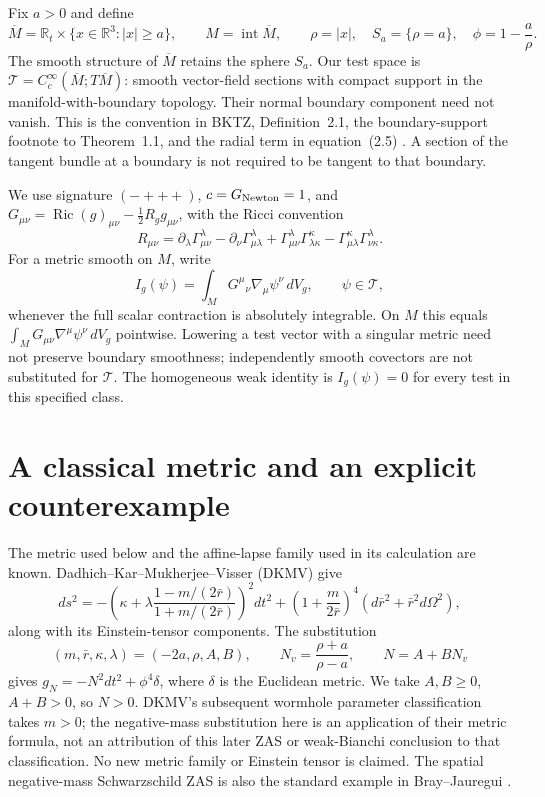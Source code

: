 \documentclass[11pt]{article}
\newcommand{\Ric}{\operatorname{Ric}}
\newcommand{\dV}{\,dV}
\begin{document}
Fix $a>0$ and define
\[
 \overline M=\mathbb R_t\times\{x\in\mathbb R^3:|x|\ge a\},\qquad
 M=\operatorname{int}\overline M,\qquad
 \rho=|x|,\quad S_a=\{\rho=a\},\quad \phi=1-\frac a\rho.
\]
The smooth structure of $\overline M$ retains the sphere $S_a$. Our test space
is $\mathcal T=C_c^\infty(\overline M;T\overline M)$: smooth vector-field sections
with compact support in the manifold-with-boundary topology. Their normal
boundary component need not vanish. This is the convention in BKTZ,
Definition~2.1, the boundary-support footnote to Theorem~1.1, and the radial term
in equation~(2.5) \cite{BKTZ}. A section of the tangent bundle at a boundary is
not required to be tangent to that boundary.

We use signature $(-+++)$, $c=G_{\rm Newton}=1$, and
$G_{\mu\nu}=\Ric(g)_{\mu\nu}-\tfrac12 R_g g_{\mu\nu}$, with the Ricci convention
\[
R_{\mu\nu}=\partial_\lambda\Gamma^\lambda_{\mu\nu}
-\partial_\nu\Gamma^\lambda_{\mu\lambda}
+\Gamma^\lambda_{\mu\nu}\Gamma^\kappa_{\lambda\kappa}
-\Gamma^\kappa_{\mu\lambda}\Gamma^\lambda_{\nu\kappa}.
\]
For a metric smooth on $M$, write
\begin{equation}\label{eq:I}
 I_g(\psi)=\int_M G^\mu{}_{\nu}\nabla_\mu\psi^\nu\dV_g,
 \qquad \psi\in\mathcal T,
\end{equation}
whenever the full scalar contraction is absolutely integrable. On $M$ this
equals $\int_M G_{\mu\nu}\nabla^\mu\psi^\nu\dV_g$ pointwise. Lowering a test vector
with a singular metric need not preserve boundary smoothness; independently
smooth covectors are not substituted for $\mathcal T$. The homogeneous weak
identity is $I_g(\psi)=0$ for every test in this specified class.

\section{A classical metric and an explicit counterexample}

The metric used below and the affine-lapse family used in its calculation are
known. Dadhich--Kar--Mukherjee--Visser (DKMV) give
\cite[equations~(9)--(15)]{DKMV}
\[
 ds^2=-\left(\kappa+\lambda\frac{1-m/(2\bar r)}{1+m/(2\bar r)}\right)^2dt^2
       +\left(1+\frac{m}{2\bar r}\right)^4
        (d\bar r^2+\bar r^2d\Omega^2),
\]
along with its Einstein-tensor components. The substitution
\begin{equation}\label{eq:dictionary}
 (m,\bar r,\kappa,\lambda)=(-2a,\rho,A,B),\qquad
 N_v=\frac{\rho+a}{\rho-a},\qquad N=A+B N_v
\end{equation}
gives $g_N=-N^2dt^2+\phi^4\delta$, where $\delta$ is the Euclidean metric.
We take $A,B\ge0$, $A+B>0$, so $N>0$. DKMV's subsequent wormhole parameter
classification takes $m>0$; the negative-mass substitution here is an
application of their metric formula, not an attribution of this later ZAS or
weak-Bianchi conclusion to that classification. No new metric family or
Einstein tensor is claimed. The spatial negative-mass Schwarzschild ZAS is
also the standard example in Bray--Jauregui \cite{BJ}.
\end{document}
